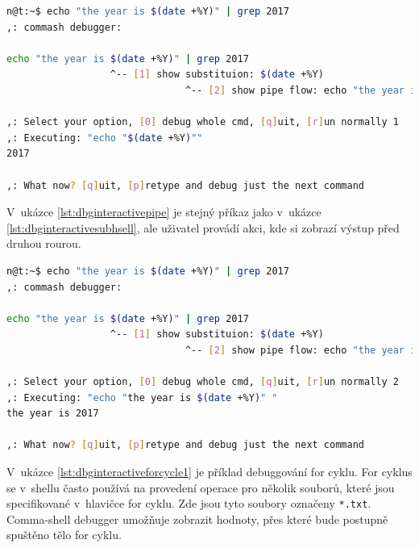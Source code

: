 \documentclass[thesis=M,czech]{FITthesis}[2012/06/26]
\begin{document}
\noindent
\begin{minipage}{\linewidth}
\begin{lstlisting}[language=bash, caption={Debugger interaktivního shellu -- subshell}, label={lst:dbginteractivesubhsell}]
n@t:~$ echo "the year is $(date +%Y)" | grep 2017
,: commash debugger:

echo "the year is $(date +%Y)" | grep 2017
                  ^-- [1] show substituion: $(date +%Y)
                               ^-- [2] show pipe flow: echo "the year is $(date +%Y)"

,: Select your option, [0] debug whole cmd, [q]uit, [r]un normally 1
,: Executing: "echo "$(date +%Y)""
2017

,: What now? [q]uit, [p]retype and debug just the next command
\end{lstlisting}
\end{minipage}

V~ukázce \ref{lst:dbginteractivepipe} je stejný příkaz jako v~ukázce \ref{lst:dbginteractivesubhsell}, ale uživatel provádí akci, kde si zobrazí výstup před druhou rourou.

\noindent
\begin{minipage}{\linewidth}
\begin{lstlisting}[language=bash, caption={Debugger interaktivního shellu -- subshell}, label={lst:dbginteractivepipe}]
n@t:~$ echo "the year is $(date +%Y)" | grep 2017
,: commash debugger:

echo "the year is $(date +%Y)" | grep 2017
                  ^-- [1] show substituion: $(date +%Y)
                               ^-- [2] show pipe flow: echo "the year is $(date +%Y)"

,: Select your option, [0] debug whole cmd, [q]uit, [r]un normally 2
,: Executing: "echo "the year is $(date +%Y)" "
the year is 2017

,: What now? [q]uit, [p]retype and debug just the next command
\end{lstlisting}
\end{minipage}

V~ukázce \ref{lst:dbginteractiveforcycle1} je příklad debuggování for cyklu. For cyklus se v~shellu často používá na provedení operace pro několik souborů, které jsou specifikované v~hlavičce for cyklu. Zde jsou tyto soubory označeny \texttt{*.txt}. Comma-shell debugger umožňuje zobrazit hodnoty, přes které bude postupně spuštěno tělo for cyklu.
\end{document}
